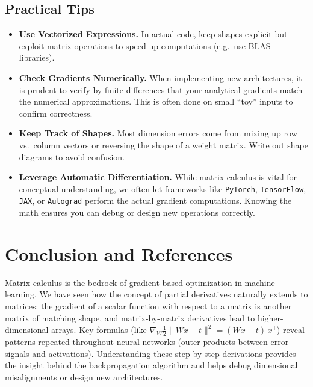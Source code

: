 \documentclass[11pt]{article}
\begin{document}
\subsection{Practical Tips}
\begin{itemize}[leftmargin=2em]
    \item \textbf{Use Vectorized Expressions.} 
    In actual code, keep shapes explicit but exploit matrix operations to speed up computations (e.g.\ use BLAS libraries).

    \item \textbf{Check Gradients Numerically.} 
    When implementing new architectures, it is prudent to verify by finite differences 
    that your analytical gradients match the numerical approximations. 
    This is often done on small “toy” inputs to confirm correctness.

    \item \textbf{Keep Track of Shapes.} 
    Most dimension errors come from mixing up row vs.\ column vectors 
    or reversing the shape of a weight matrix. 
    Write out shape diagrams to avoid confusion.

    \item \textbf{Leverage Automatic Differentiation.} 
    While matrix calculus is vital for conceptual understanding, 
    we often let frameworks like \texttt{PyTorch}, \texttt{TensorFlow}, \texttt{JAX}, or \texttt{Autograd} 
    perform the actual gradient computations. 
    Knowing the math ensures you can debug or design new operations correctly.
\end{itemize}

\vspace{1cm}
\section{Conclusion and References}
\label{sec:conclusion}

Matrix calculus is the bedrock of gradient-based optimization in machine learning. 
We have seen how the concept of partial derivatives naturally extends to matrices: 
the gradient of a scalar function with respect to a matrix is another matrix of matching shape, 
and matrix-by-matrix derivatives lead to higher-dimensional arrays. 
Key formulas (like $\nabla_W \tfrac12 \|W x - t\|^2 = (W x - t)\,x^\mathsf{T}$) 
reveal patterns repeated throughout neural networks (outer products between error signals and activations). 
Understanding these step-by-step derivations provides the insight behind 
the backpropagation algorithm and helps debug dimensional misalignments or design new architectures.
\end{document}
